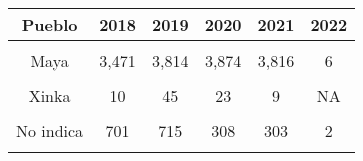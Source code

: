 \begin{tabular}[t]{cccccc}
\toprule
\textbf{Pueblo} & \textbf{2018} & \textbf{2019} & \textbf{2020} & \textbf{2021} & \textbf{2022}\\
\midrule
\cellcolor[HTML]{A8A4FB}{Ladino} & \cellcolor[HTML]{A8A4FB}{10,367} & \cellcolor[HTML]{A8A4FB}{11,480} & \cellcolor[HTML]{A8A4FB}{9,608} & \cellcolor[HTML]{A8A4FB}{12,291} & \cellcolor[HTML]{A8A4FB}{222}\\
Maya & 3,471 & 3,814 & 3,874 & 3,816 & 6\\
\cellcolor[HTML]{A8A4FB}{Garífuna} & \cellcolor[HTML]{A8A4FB}{11} & \cellcolor[HTML]{A8A4FB}{18} & \cellcolor[HTML]{A8A4FB}{32} & \cellcolor[HTML]{A8A4FB}{16} & \cellcolor[HTML]{A8A4FB}{1}\\
Xinka & 10 & 45 & 23 & 9 & NA\\
\cellcolor[HTML]{A8A4FB}{Otro} & \cellcolor[HTML]{A8A4FB}{947} & \cellcolor[HTML]{A8A4FB}{1,150} & \cellcolor[HTML]{A8A4FB}{1299} & \cellcolor[HTML]{A8A4FB}{1,008} & \cellcolor[HTML]{A8A4FB}{55}\\
No indica & 701 & 715 & 308 & 303 & 2\\
\cellcolor[HTML]{A8A4FB}{Ignorado} & \cellcolor[HTML]{A8A4FB}{31,963} & \cellcolor[HTML]{A8A4FB}{34,982} & \cellcolor[HTML]{A8A4FB}{37,295} & \cellcolor[HTML]{A8A4FB}{37,291} & \cellcolor[HTML]{A8A4FB}{40,001}\\
\bottomrule
\end{tabular}
